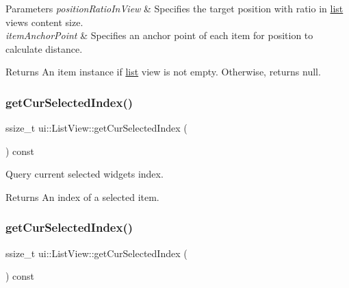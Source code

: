 \begin{DoxyParams}{Parameters}
{\em position\+Ratio\+In\+View} & Specifies the target position with ratio in \hyperlink{protocollist-p}{list} view\textquotesingle{}s content size. \\
\hline
{\em item\+Anchor\+Point} & Specifies an anchor point of each item for position to calculate distance. \\
\hline
\end{DoxyParams}
\begin{DoxyReturn}{Returns}
An item instance if \hyperlink{protocollist-p}{list} view is not empty. Otherwise, returns null. 
\end{DoxyReturn}
\mbox{\label{classui_1_1ListView_a6efee3d32e83e99b248afd96dfbfef94}} 
\subsubsection{\texorpdfstring{get\+Cur\+Selected\+Index()}{getCurSelectedIndex()}\hspace{0.1cm}{\footnotesize\ttfamily [1/2]}}
{\footnotesize\ttfamily ssize\+\_\+t ui\+::\+List\+View\+::get\+Cur\+Selected\+Index (\begin{DoxyParamCaption}{ }\end{DoxyParamCaption}) const}



Query current selected widget\textquotesingle{}s index. 

\begin{DoxyReturn}{Returns}
An index of a selected item. 
\end{DoxyReturn}
\mbox{\label{classui_1_1ListView_a6efee3d32e83e99b248afd96dfbfef94}} 
\subsubsection{\texorpdfstring{get\+Cur\+Selected\+Index()}{getCurSelectedIndex()}\hspace{0.1cm}{\footnotesize\ttfamily [2/2]}}
{\footnotesize\ttfamily ssize\+\_\+t ui\+::\+List\+View\+::get\+Cur\+Selected\+Index (\begin{DoxyParamCaption}{ }\end{DoxyParamCaption}) const}



